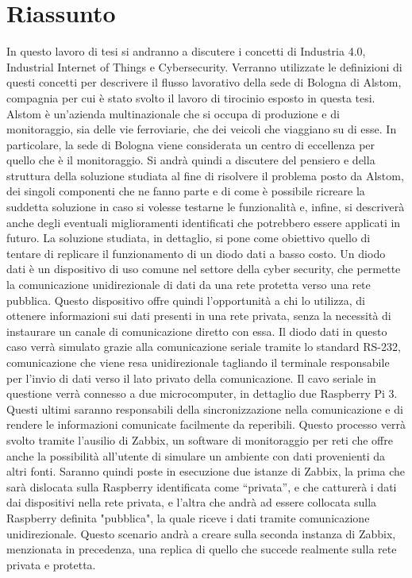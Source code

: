 \documentclass[a4paper, 12pt]{book}
\begin{document}
\pagestyle{empty}
\clearpage
\tableofcontents
\thispagestyle{empty}


\chapter{Riassunto}

In questo lavoro di tesi si andranno a discutere i concetti di Industria 4.0, Industrial
Internet of Things e Cybersecurity. Verranno utilizzate le definizioni di questi concetti
per descrivere il flusso lavorativo della sede di Bologna di Alstom, compagnia per cui
è stato svolto il lavoro di tirocinio esposto in questa tesi. Alstom è un’azienda
multinazionale che si occupa di produzione e di monitoraggio, sia delle vie
ferroviarie, che dei veicoli che viaggiano su di esse. In particolare, la sede di
Bologna viene considerata un centro di eccellenza per quello che è il monitoraggio.
Si andrà quindi a discutere del pensiero e della struttura della soluzione studiata al
fine di risolvere il problema posto da Alstom, dei singoli componenti che ne fanno
parte e di come è possibile ricreare la suddetta soluzione in caso si volesse testarne
le funzionalità e, infine, si descriverà anche degli eventuali miglioramenti identificati
che potrebbero essere applicati in futuro.
La soluzione studiata, in dettaglio, si pone come obiettivo quello di tentare di
replicare il funzionamento di un diodo dati a basso costo. Un diodo dati è un
dispositivo di uso comune nel settore della cyber security, che permette la
comunicazione unidirezionale di dati da una rete protetta verso una rete pubblica.
Questo dispositivo offre quindi l’opportunità a chi lo utilizza, di ottenere informazioni
sui dati presenti in una rete privata, senza la necessità di instaurare un canale di
comunicazione diretto con essa. Il diodo dati in questo caso verrà simulato grazie
alla comunicazione seriale tramite lo standard RS-232, comunicazione che viene
resa unidirezionale tagliando il terminale responsabile per l’invio di dati verso il lato
privato della comunicazione. Il cavo seriale in questione verrà connesso a due
microcomputer, in dettaglio due Raspberry Pi 3. Questi ultimi saranno responsabili
della sincronizzazione nella comunicazione e di rendere le informazioni comunicate
facilmente da reperibili. Questo processo verrà svolto tramite l’ausilio di Zabbix, un
software di monitoraggio per reti che offre anche la possibilità all’utente di simulare
un ambiente con dati provenienti da altri fonti. Saranno quindi poste in esecuzione
due istanze di Zabbix, la prima che sarà dislocata sulla Raspberry identificata come
“privata”, e che catturerà i dati dai dispositivi nella rete privata, e l’altra che andrà ad
essere collocata sulla Raspberry definita "pubblica", la quale riceve i dati tramite
comunicazione unidirezionale. Questo scenario andrà a creare sulla seconda
instanza di Zabbix, menzionata in precedenza, una replica di quello che succede
realmente sulla rete privata e protetta.
\end{document}
